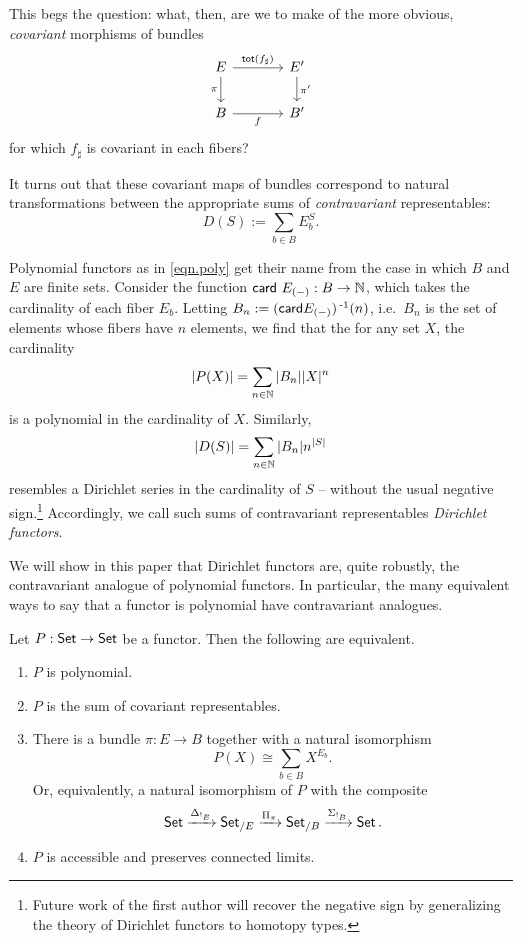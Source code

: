 This begs the question: what, then, are we to make of the more obvious,
\emph{covariant} morphisms of bundles
\[
  \begin{tikzcd}[column sep=large]
E \arrow[r, "\term{tot}(f_{\sharp})"] \arrow[d, "\pi"'] & E' \arrow[d, "\pi'"] \\
B \arrow[r, "f"']                                       & B'                  
\end{tikzcd}
\]
for which $f_\sharp$ is covariant
in each fibers?

It turns out that these covariant maps of bundles correspond to natural
transformations between the appropriate sums of \emph{contravariant}
representables:
$$D(S) := \sum_{b \in B} E_b^S.$$

Polynomial functors as in \eqref{eqn.poly} get their name from the case in which
$B$ and $E$ are finite sets. Consider the function $\mathsf{{card}}~E_{(-)} : B \to
\operatorname{\mathbb{N}}$, which takes the cardinality of each fiber $E_b$. Letting $B_n :=
(\mathsf{{card}}E_{(-)})\operatorname{^{-1}}(n)$, i.e.\ $B_n$ is the set of elements whose fibers have $n$ elements,
we find that the for any set $X$, the cardinality
$$|P(X)| = \sum_{n \in \operatorname{\mathbb{N}}} |B_n||X|^n$$
is a polynomial in the cardinality of $X$. Similarly,
$$|D(S)| = \sum_{n \in \operatorname{\mathbb{N}}} |B_n|n^{|S|}$$
resembles a Dirichlet series in the cardinality of $S$ -- without the usual
negative sign.\footnote{Future work of the first author will recover the
  negative sign by generalizing the theory of Dirichlet functors to homotopy
  types.} Accordingly, we call such
sums of contravariant representables \emph{Dirichlet functors}.

We will show in this paper that Dirichlet functors are, quite robustly, the
contravariant analogue of polynomial functors. In particular, the many equivalent ways to
say that a functor is polynomial have contravariant analogues.
\begin{thm}[cite]\label{thm:polynomial.set.characterization}
  Let $P : \operatorname{\mathsf{{Set}}} \to \operatorname{\mathsf{{Set}}}$ be a functor. Then the following are equivalent.
  \begin{enumerate}
  \item $P$ is polynomial.
  \item $P$ is the sum of covariant representables.
  \item There is a bundle $\pi : E \to B$ together with a natural isomorphism
    $$P(X) \cong \sum_{b \in B} X^{E_b}.$$
    Or, equivalently, a natural isomorphism of $P$ with the composite
    $$\operatorname{\mathsf{{Set}}} \xrightarrow{{\Delta_{!_E}}} \operatorname{\mathsf{{Set}}}_{/E} \xrightarrow{{\Pi_\pi}} \operatorname{\mathsf{{Set}}}_{/B} \xrightarrow{{\Sigma_{!_B}}} \operatorname{\mathsf{{Set}}}.$$
  \item $P$ is accessible and preserves connected limits.
  \end{enumerate}
\end{thm}

